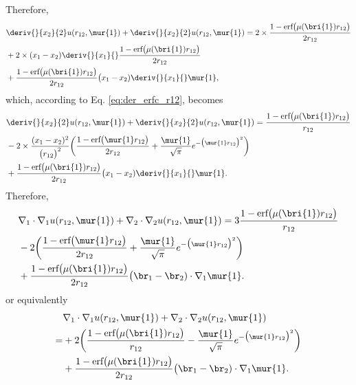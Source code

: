 Therefore, 
\begin{equation}
 \begin{aligned}
 & \deriv{}{x_2}{2}u(r_{12},\mur{1}) + \deriv{}{x_2}{2}u(r_{12},\mur{1})  = 2 \times \frac{1 - \text{erf}\big(\mu(\bri{1}) r_{12} \big)}{2 r_{12}} \\
                                    & + 2 \times (x_1 - x_2) \deriv{}{x_1}{} \frac{1 - \text{erf}\big(\mu(\bri{1}) r_{12} \big)}{2 r_{12}} \\ 
& + \frac{1 - \text{erf}\big(\mu(\bri{1}) r_{12} \big)}{2 r_{12}}\big( x_1 - x_2) \deriv{}{x_1}{} \mur{1}, 
 \end{aligned}
\end{equation}
which, according to Eq. \eqref{eq:der_erfc_r12}, becomes  
\begin{equation}
 \begin{aligned}
 & \deriv{}{x_2}{2}u(r_{12},\mur{1}) + \deriv{}{x_2}{2}u(r_{12},\mur{1}) = \frac{1 - \text{erf}\big(\mu(\bri{1}) r_{12} \big)}{r_{12}} \\ 
 & - 2 \times \frac{(x_1 - x_2)^2}{\big( r_{12} \big)^2}\bigg(\frac{1 - \text{erf}\big( \mur{1} r_{12} \big)}{2 r_{12}}  + \frac{\mur{1}}{\sqrt{\pi}} e^{-\big(\mur{1} r_{12} \big)^2}      \bigg) \\
& + \frac{1 - \text{erf}\big(\mu(\bri{1}) r_{12} \big)}{2 r_{12}}\big( x_1 - x_2) \deriv{}{x_1}{} \mur{1}. 
 \end{aligned}
\end{equation}
Therefore, 
\begin{equation}
 \begin{aligned}
& \nabla_1 \cdot \nabla_1 u(r_{12},\mur{1}) +  \nabla_2 \cdot \nabla_2 u(r_{12},\mur{1}) = 
 3 \frac{1 - \text{erf}\big(\mu(\bri{1}) r_{12} \big)}{r_{12}} \\
& - 2 \bigg(\frac{1 - \text{erf}\big( \mur{1} r_{12} \big)}{2 r_{12}}  +                   \frac{\mur{1}}{\sqrt{\pi}} e^{-\big(\mur{1} r_{12} \big)^2}      \bigg) \\
& + \frac{1 - \text{erf}\big(\mu(\bri{1}) r_{12} \big)}{2 r_{12}}\big( \br_1 - \br_2) \cdot \nabla_1 \mur{1}. 
 \end{aligned}
\end{equation}
or equivalently 
\begin{equation}
 \begin{aligned}
& \nabla_1 \cdot \nabla_1 u(r_{12},\mur{1}) +  \nabla_2 \cdot \nabla_2 u(r_{12},\mur{1})  \\
 =& +2 \bigg( \frac{1 - \text{erf}\big(\mu(\bri{1}) r_{12} \big)}{r_{12}} -  \frac{\mur{1}}{\sqrt{\pi}} e^{-\big(\mur{1} r_{12} \big)^2} \bigg) \\
& + \frac{1 - \text{erf}\big(\mu(\bri{1}) r_{12} \big)}{2 r_{12}}\big( \br_1 - \br_2) \cdot \nabla_1 \mur{1}. 
 \end{aligned}
\end{equation}

